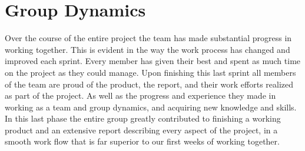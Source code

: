 \section{Group Dynamics}
\label{sec:FinalDynamics}
Over the course of the entire project the team has made substantial progress in working together. This is evident in the way the work process has changed and improved each sprint. Every member has given their best and spent as much time on the project as they could manage. Upon finishing this last sprint all members of the team are proud of the product, the report, and their work efforts realized as part of the project. As well as the progress and experience they made in working as a team and group dynamics, and acquiring new knowledge and skills. In this last phase the entire group greatly contributed to finishing a working product and an extensive report describing every aspect of the project, in a smooth work flow that is far superior to our first weeks of working together. 